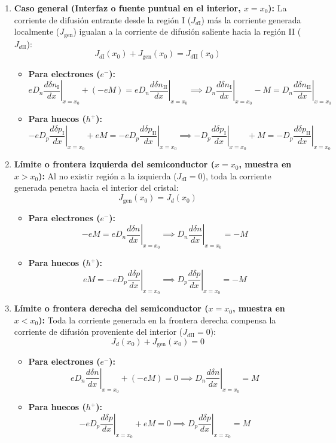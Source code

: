 \begin{enumerate}[label=\alph*)]
    \item \textbf{Caso general (Interfaz o fuente puntual en el interior, $x = x_0$):}
    La corriente de difusión entrante desde la región I ($J_{d\text{I}}$) más la corriente generada localmente ($J_{\text{gen}}$) igualan a la corriente de difusión saliente hacia la región II ($J_{d\text{II}}$):
    \[
    J_{d\text{I}}(x_0) + J_{\text{gen}}(x_0) = J_{d\text{II}}(x_0)
    \]
    \begin{itemize}
        \item \textbf{Para electrones ($e^-$):}
        \[
        e D_n \left. \frac{d\delta n_{\text{I}}}{dx} \right|_{x=x_0} + (-e M) = e D_n \left. \frac{d\delta n_{\text{II}}}{dx} \right|_{x=x_0} \implies D_n \left. \frac{d\delta n_{\text{I}}}{dx} \right|_{x=x_0} - M = D_n \left. \frac{d\delta n_{\text{II}}}{dx} \right|_{x=x_0}
        \]
        \item \textbf{Para huecos ($h^+$):}
        \[
        -e D_p \left. \frac{d\delta p_{\text{I}}}{dx} \right|_{x=x_0} + e M = -e D_p \left. \frac{d\delta p_{\text{II}}}{dx} \right|_{x=x_0} \implies -D_p \left. \frac{d\delta p_{\text{I}}}{dx} \right|_{x=x_0} + M = -D_p \left. \frac{d\delta p_{\text{II}}}{dx} \right|_{x=x_0}
        \]
    \end{itemize}

    \item \textbf{Límite o frontera izquierda del semiconductor ($x = x_0$, muestra en $x > x_0$):}
    Al no existir región a la izquierda ($J_{d\text{I}} = 0$), toda la corriente generada penetra hacia el interior del cristal:
    \[
    J_{\text{gen}}(x_0) = J_d(x_0)
    \]
    \begin{itemize}
        \item \textbf{Para electrones ($e^-$):}
        \[
        -e M = e D_n \left. \frac{d\delta n}{dx} \right|_{x=x_0} \implies D_n \left. \frac{d\delta n}{dx} \right|_{x=x_0} = -M
        \]
        \item \textbf{Para huecos ($h^+$):}
        \[
        e M = -e D_p \left. \frac{d\delta p}{dx} \right|_{x=x_0} \implies D_p \left. \frac{d\delta p}{dx} \right|_{x=x_0} = -M
        \]
    \end{itemize}

    \item \textbf{Límite o frontera derecha del semiconductor ($x = x_0$, muestra en $x < x_0$):}
    Toda la corriente generada en la frontera derecha compensa la corriente de difusión proveniente del interior ($J_{d\text{II}} = 0$):
    \[
    J_d(x_0) + J_{\text{gen}}(x_0) = 0
    \]
    \begin{itemize}
        \item \textbf{Para electrones ($e^-$):}
        \[
        e D_n \left. \frac{d\delta n}{dx} \right|_{x=x_0} + (-e M) = 0 \implies D_n \left. \frac{d\delta n}{dx} \right|_{x=x_0} = M
        \]
        \item \textbf{Para huecos ($h^+$):}
        \[
        -e D_p \left. \frac{d\delta p}{dx} \right|_{x=x_0} + e M = 0 \implies D_p \left. \frac{d\delta p}{dx} \right|_{x=x_0} = M
        \]
    \end{itemize}
\end{enumerate}

